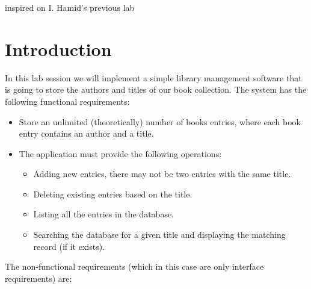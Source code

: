 \documentclass{exercices}
\renewcommand{\|}{\url|}
\begin{document}
inspired on I. Hamid's previous lab

\section{Introduction}
In this lab session we will implement a simple library management software that is going to 
store the authors and titles of our book collection. The system has the following functional
requirements:
\begin{itemize}
  \item Store an unlimited (theoretically) number of books entries, where each book entry contains an author and a title.
  \item The application must provide the following operations:
    \begin{itemize}
    \item Adding new entries, there may not be two entries with the same title.
    \item Deleting existing entries based on the title.
    \item Listing all the entries in the database.
    \item Searching the database for a given title and displaying the matching record (if it exists).
    \end{itemize}
\end{itemize}
The non-functional requirements (which in this case are only interface requirements) are:
\end{document}
